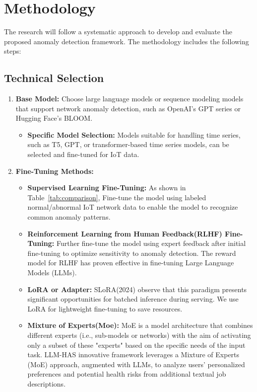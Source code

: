 \documentclass[12pt]{article}
\begin{document}
\section{Methodology}
\label{sec:methodology}

  The research will follow a systematic approach to develop and evaluate the proposed anomaly detection framework. The methodology includes the following steps:

\subsection{Technical Selection}
\begin{enumerate}[label=\arabic*.]
\item \textbf{Base Model:} Choose large language models or sequence modeling models that support network anomaly detection, such as OpenAI's GPT series or Hugging Face's BLOOM.
  \begin{itemize}
    \item \textbf{Specific Model Selection:} Models suitable for handling time series, such as T5, GPT, or transformer-based time series models, can be selected and fine-tuned for IoT data.
  \end{itemize}

  \item \textbf{Fine-Tuning Methods:}
  \begin{itemize}
    \item \textbf{Supervised Learning Fine-Tuning:} As shown in Table~\ref{tab:comparison}, Fine-tune the model using labeled normal/abnormal
    IoT network data to enable the model to recognize common anomaly patterns.
    
    \item \textbf{Reinforcement Learning from Human Feedback(RLHF) Fine-Tuning:} Further fine-tune the model using expert feedback after initial fine-tuning to optimize sensitivity to anomaly detection.
    The reward model for RLHF has proven effective in fine-tuning Large Language Models
    (LLMs)\citep{zhang2024prototypical}.
    
    \item \textbf{LoRA or Adapter:} SLoRA(2024) observe that this paradigm presents significant opportunities for batched inference during serving\citep{sheng2024slora}. We use LoRA for lightweight fine-tuning to save resources.
    
    \item \textbf{Mixture of Experts(Moe):} MoE is a model architecture that combines different experts (i.e., sub-models or networks) with the aim of activating only a subset of these "experts" based on the specific needs of the input task.
    LLM-HAS innovative framework leverages a Mixture
    of Experts (MoE) approach, augmented with LLMs, to analyze
    users’ personalized preferences and potential health risks from
    additional textual job descriptions\citep{gao2024guiding}.
  \end{itemize}


\end{enumerate}
\end{document}
